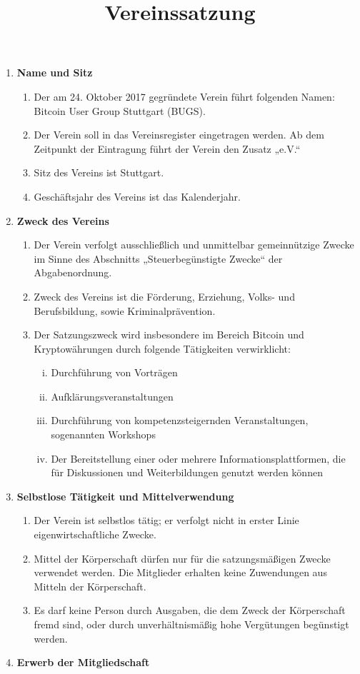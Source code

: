 \documentclass[a4paper,11pt]{article}
\title{\textsf{\textbf{Vereinssatzung}}}
\author{}
\date{}
\begin{document}
\maketitle

\begin{enumerate}[§ 1.]
\item \textsf{\textbf{Name und Sitz}}

\begin{enumerate}[1.]
\item Der am 24. Oktober 2017 gegründete Verein führt folgenden Namen: Bitcoin User Group Stuttgart (BUGS).
\item Der Verein soll in das Vereinsregister eingetragen werden. Ab dem Zeitpunkt der Eintragung führt der Verein den Zusatz „e.V.“
\item Sitz des Vereins ist Stuttgart.
\item Geschäftsjahr des Vereins ist das Kalenderjahr.
\end{enumerate}

\item \textsf{\textbf{Zweck des Vereins}}
\begin{enumerate}[1.]
\item Der Verein verfolgt ausschließlich und unmittelbar gemeinnützige Zwecke im Sinne des Abschnitts „Steuerbegünstigte Zwecke“ der Abgabenordnung.
\item Zweck des Vereins ist die Förderung, Erziehung, Volks- und Berufsbildung, sowie Kriminalprävention.
\item Der Satzungszweck wird insbesondere im Bereich Bitcoin und Kryptowährungen durch folgende Tätigkeiten verwirklicht:
\begin{enumerate}[i)]
\item Durchführung von Vorträgen
\item Aufklärungsveranstaltungen
\item Durchführung von kompetenzsteigernden Veranstaltungen, sogenannten Workshops
\item Der Bereitstellung einer oder mehrere Informationsplattformen, die für Diskussionen und
Weiterbildungen genutzt werden können
\end{enumerate}
\end{enumerate}

\item \textsf{\textbf{Selbstlose Tätigkeit und Mittelverwendung}}

\begin{enumerate}[1.]
\item Der Verein ist selbstlos tätig; er verfolgt nicht in erster Linie eigenwirtschaftliche Zwecke.
\item Mittel der Körperschaft dürfen nur für die satzungsmäßigen Zwecke verwendet werden. Die
Mitglieder erhalten keine Zuwendungen aus Mitteln der Körperschaft.
\item Es darf keine Person durch Ausgaben, die dem Zweck der Körperschaft fremd sind, oder durch
unverhältnismäßig hohe Vergütungen begünstigt werden.
\end{enumerate}
\newpage
\item \textsf{\textbf{Erwerb der Mitgliedschaft}}


\end{enumerate}
\end{document}
